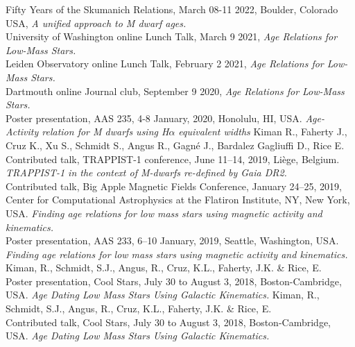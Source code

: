 \documentclass[10pt]{cv}
\begin{document}
\begin{llist}

Fifty Years of the Skumanich Relations, March 08-11 2022, Boulder, Colorado USA, \textit{A unified approach to M dwarf ages.}\\
University of Washington online Lunch Talk, March 9 2021, \textit{Age Relations for Low-Mass Stars.}\\
Leiden Observatory online Lunch Talk, February 2 2021, \textit{Age Relations for Low-Mass Stars.}\\
Dartmouth online Journal club, September 9 2020, \textit{Age Relations for Low-Mass Stars.}\\
Poster presentation, AAS 235, 4-8 January, 2020, Honolulu, HI, USA. \textit{Age-Activity relation for M dwarfs using H$\alpha$ equivalent widths} Kiman R., Faherty J., Cruz K., Xu S., Schmidt S., Angus R., Gagn\'e J., Bardalez Gagliuffi D., Rice E.\\
Contributed talk, TRAPPIST-1 conference, June 11--14, 2019, Li\`ege, Belgium. \textit{TRAPPIST-1 in the context of M-dwarfs re-defined by Gaia DR2.}\\
Contributed talk, Big Apple Magnetic Fields Conference, January 24--25, 2019, Center for Computational Astrophysics at the Flatiron Institute, NY, New York, USA. \textit{Finding age relations for low mass stars using magnetic activity and kinematics.}\\
Poster presentation, AAS 233, 6--10 January, 2019, Seattle, Washington, USA. \textit{Finding age relations for low mass stars using magnetic activity and kinematics.} Kiman, R., Schmidt, S.J., Angus, R., Cruz, K.L., Faherty, J.K. \& Rice, E.\\
Poster presentation, Cool Stars, July 30 to August 3, 2018, Boston-Cambridge, USA. \textit{Age Dating Low Mass Stars Using Galactic Kinematics.} Kiman, R., Schmidt, S.J., Angus, R., Cruz, K.L., Faherty, J.K. \& Rice, E.\\
Contributed talk, Cool Stars, July 30 to August 3, 2018, Boston-Cambridge, USA. \textit{Age Dating Low Mass Stars Using Galactic Kinematics.} \\

\end{llist}
\end{document}
